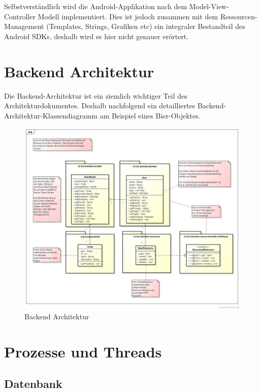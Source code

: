 \documentclass[10pt,a4paper]{scrartcl}
\begin{document}
Selbstverständlich wird die Android-Applikation nach dem Model-View-Controller Modell implementiert.
Dies ist jedoch zusammen mit dem Ressourcen-Management (Templates, Strings, Grafiken etc) ein integraler Bestandteil des Android SDKs, deshalb wird es hier nicht genauer erörtert.


\newpage
\section{Backend Architektur}

Die Backend-Architektur ist ein ziemlich wichtiger Teil des Architekturdokumentes. Deshalb
nachfolgend ein detailliertes Backend-Architektur-Klassendiagramm am Beispiel eines Bier-Objektes.

\begin{figure}[H]
	\includegraphics[height=\textwidth,angle=90]{BackendArchitektur.png}
	\caption{Backend Architektur}
	\label{fig:backend_architecture}
\end{figure}


\section{Prozesse und Threads}

\subsection{Datenbank}
\end{document}
